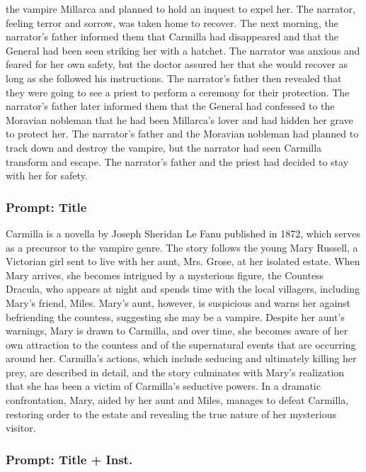 \documentclass{article} %
\begin{document}
the vampire Millarca and planned to hold an inquest to expel her. The narrator, feeling terror and sorrow, was taken home to recover. \textcolor{skipred}{The next morning, the narrator's father informed them that Carmilla had disappeared and that the General had been seen striking her with a hatchet.} The narrator was anxious and feared for her own safety, but the doctor assured her that she would recover as long as she followed his instructions. \textcolor{skipred}{The narrator's father then revealed that they were going to see a priest to perform a ceremony for their protection. The narrator's father later informed them that the General had confessed to the Moravian nobleman that he had been Millarca's lover and had hidden her grave to protect her.} The narrator's father and the Moravian nobleman had planned to track down and destroy the vampire, but the narrator had seen Carmilla transform and escape. The narrator's father and the priest had decided to stay with her for safety.

\subsubsection{Prompt: Title}

\textcolor{skipred}{Carmilla is a novella by Joseph Sheridan Le Fanu published in 1872, which serves as a precursor to the vampire genre. The story follows the young Mary Russell, a Victorian girl sent to live with her aunt, Mrs. Grose, at her isolated estate. When Mary arrives, she becomes intrigued by a mysterious figure, the Countess Dracula, who appears at night and spends time with the local villagers, including Mary's friend, Miles. Mary's aunt, however, is suspicious and warns her against befriending the countess, suggesting she may be a vampire.} Despite her aunt's warnings, Mary is drawn to Carmilla, and over time, she becomes aware of her own attraction to the countess and of the supernatural events that are occurring around her. Carmilla's actions, which include seducing and ultimately killing her prey, are described in detail, and the story culminates with Mary's realization that she has been a victim of Carmilla's seductive powers. \textcolor{skipred}{In a dramatic confrontation, Mary, aided by her aunt and Miles, manages to defeat Carmilla, restoring order to the estate and revealing the true nature of her mysterious visitor.}

\subsubsection{Prompt: Title + Inst.}
\end{document}
